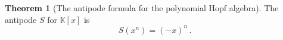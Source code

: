 \documentclass[12pt, reqno]{amsart}
\theoremstyle{definition}
\newtheorem{thm}{Theorem}[section]
\newcommand{\opi}{\vec{\boldsymbol{\pi}}}
\DeclareMathOperator{\id}{id}
\begin{document}
\begin{thm}[The antipode formula for the polynomial Hopf algebra]\label{thm:polyHA}
The antipode $S$ for $\mathbb{K}[x] $ is 
$$ S(x^n) =(-x)^n\, . $$
\end{thm}
%
%
%
%
%
%
\end{document}
